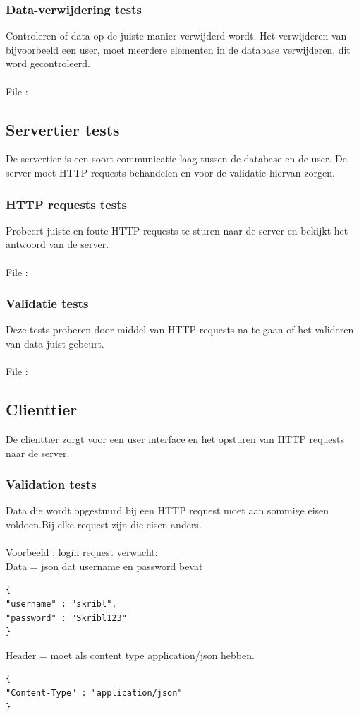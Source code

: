 \documentclass{article}
\begin{document}
\subsubsection{Data-verwijdering tests}
Controleren of data op de juiste manier verwijderd wordt. Het verwijderen van bijvoorbeeld een user, moet meerdere elementen in de database verwijderen, dit word gecontroleerd.
\\
\\
File : 
\subsection{Servertier tests}
De servertier is een soort communicatie laag tussen de database en de user. De server moet HTTP requests behandelen en voor de validatie hiervan zorgen.

\subsubsection{HTTP requests tests}
Probeert juiste en foute HTTP requests te sturen naar de server en bekijkt het antwoord van de server.
\\
\\
File : 
\subsubsection{Validatie tests}
Deze tests proberen door middel van HTTP requests na te gaan of het valideren van data juist gebeurt.
\\
\\
File :
\subsection{Clienttier}
De clienttier zorgt voor een user interface en het opsturen van HTTP requests naar de server. 
\subsubsection{Validation tests}
Data die wordt opgestuurd bij een HTTP request moet aan sommige eisen voldoen.Bij elke request zijn die eisen anders.
\\
\\
Voorbeeld : login request verwacht:
\\
Data = json dat username en password bevat
\begin{verbatim}
{
"username" : "skribl",
"password" : "Skribl123"
}
\end{verbatim}
Header = moet als content type application/json hebben.
\begin{verbatim}
{
"Content-Type" : "application/json"
}
\end{verbatim}
\end{document}
